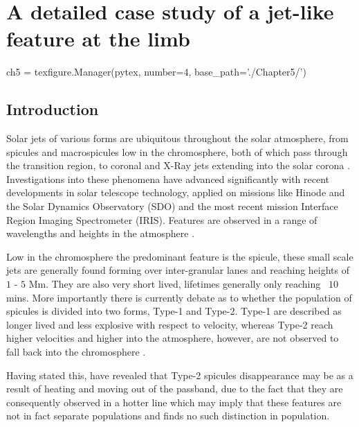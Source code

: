 

\label{ch:5}
\chapter{A detailed case study of a jet-like feature at the limb}
\begin{pycode}[chapter5]
ch5 = texfigure.Manager(pytex, number=4, base_path='./Chapter5/')
\end{pycode}

\section{Introduction}
Solar jets of various forms are ubiquitous throughout the solar atmosphere, from spicules and macrospicules low in the chromosphere, both of which pass through the transition region, to coronal and X-Ray jets extending into the solar corona \cite{Archontis2008,Majarska2011,Morton2012}. 
Investigations into these phenomena have advanced significantly with recent developments in solar telescope technology, applied on missions like Hinode and the Solar Dynamics Observatory (SDO) and the most recent mission Interface Region Imaging Spectrometer (IRIS).
Features are observed in a range of wavelengths and heights in the atmosphere \cite{Wang1998,Yamaucho2004}. 

Low in the chromosphere the predominant feature is the spicule, these small scale jets are generally found forming over inter-granular lanes and reaching heights of $1$ - $5$ Mm.
They are also very short lived, lifetimes generally only reaching ~$10$ mins.
More importantly there is currently debate as to whether the population of spicules is divided into two forms, Type-1 and Type-2. 
Type-1 are described as longer lived and less explosive with respect to velocity, whereas Type-2 reach higher velocities and higher into the atmosphere, however, are not observed to fall back into the chromosphere \cite{DePontieu2007,Beckers1972,Sterling2000}. 

Having stated this, \cite{Pereira2014} have revealed that Type-2 spicules disappearance may be as a result of heating and moving out of the passband, due to the fact that they are consequently observed in a hotter line which may imply that these features are not in fact separate populations and \cite{Zhang2012} finds no such distinction in population.

